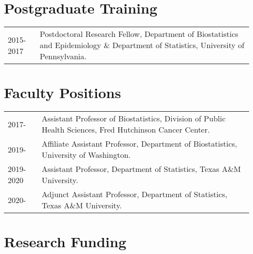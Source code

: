 \documentclass[10pt]{article}
\begin{document}
\section{Postgraduate Training} 
\begin{table}[H]
\hskip0.9cm\begin{tabular}{p{1.6cm}p{12cm}}
2015-2017 & Postdoctoral Research Fellow, {Department of Biostatistics and Epidemiology} \& {Department of Statistics}, University of Pennsylvania. %
\end{tabular}
\end{table}


\section{Faculty Positions} 
\begin{table}[H]
\hskip0.9cm\begin{tabular}{p{1.6cm}p{12cm}}
2017- & Assistant Professor of Biostatistics, Division of Public Health Sciences, Fred Hutchinson Cancer Center. \\
2019- & Affiliate Assistant Professor, Department of Biostatistics, University of Washington.  \\
2019-2020  & Assistant Professor, Department of Statistics, Texas A\&M University.\\
2020- & Adjunct Assistant Professor, Department of Statistics, Texas A\&M University.
\end{tabular}
\end{table}


\section*{Research Funding }
\end{document}
